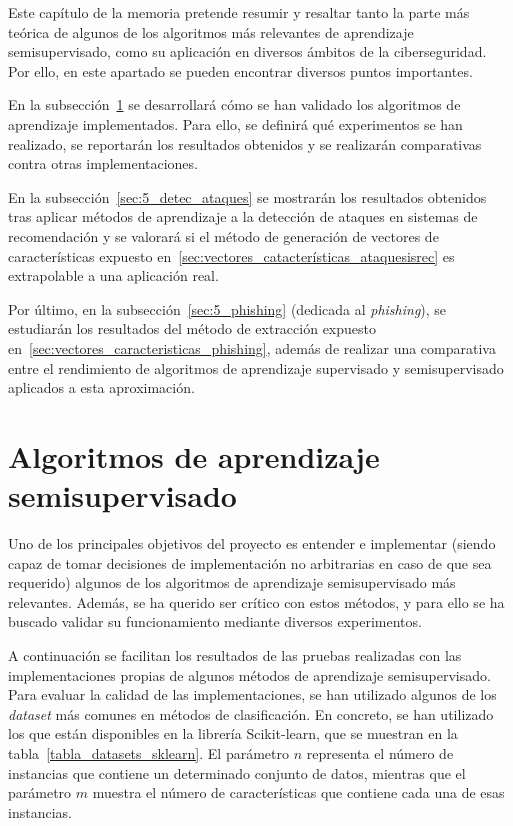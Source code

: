 \label{s:5}

Este capítulo de la memoria pretende resumir y resaltar tanto la parte más teórica de algunos de los algoritmos más relevantes de aprendizaje semisupervisado, como su aplicación en diversos ámbitos de la ciberseguridad. Por ello, en este apartado se pueden encontrar diversos puntos importantes.

En la subsección~\ref{sec:5_ssl} se desarrollará cómo se han validado los algoritmos de aprendizaje implementados. Para ello, se definirá qué experimentos se han realizado, se reportarán los resultados obtenidos y se realizarán comparativas contra otras implementaciones.

En la subsección~\ref{sec:5_detec_ataques} se mostrarán los resultados obtenidos tras aplicar métodos de aprendizaje a la detección de ataques en sistemas de recomendación y se valorará si el método de generación de vectores de características expuesto en~\ref{sec:vectores_catacterísticas_ataquesisrec} es extrapolable a una aplicación real.

Por último, en la subsección~\ref{sec:5_phishing} (dedicada al \textit{phishing}), se estudiarán los resultados del método de extracción expuesto en~\ref{sec:vectores_caracteristicas_phishing}, además de realizar una comparativa entre el rendimiento de algoritmos de aprendizaje supervisado y semisupervisado aplicados a esta aproximación.

\section{Algoritmos de aprendizaje semisupervisado}
\label{sec:5_ssl}

Uno de los principales objetivos del proyecto es entender e implementar (siendo capaz de tomar decisiones de implementación no arbitrarias en caso de que sea requerido) algunos de los algoritmos de aprendizaje semisupervisado más relevantes. Además, se ha querido ser crítico con estos métodos, y para ello se ha buscado validar su funcionamiento mediante diversos experimentos.

A continuación se facilitan los resultados de las pruebas realizadas con las implementaciones propias de algunos métodos de aprendizaje semisupervisado. Para evaluar la calidad de las implementaciones, se han utilizado algunos de los \textit{dataset} más comunes en métodos de clasificación. En concreto, se han utilizado los que están disponibles en la librería Scikit-learn, que se muestran en la tabla~\ref{tabla_datasets_sklearn}. El parámetro $n$ representa el número de instancias que contiene un determinado conjunto de datos, mientras que el parámetro $m$ muestra el número de características que contiene cada una de esas instancias.

